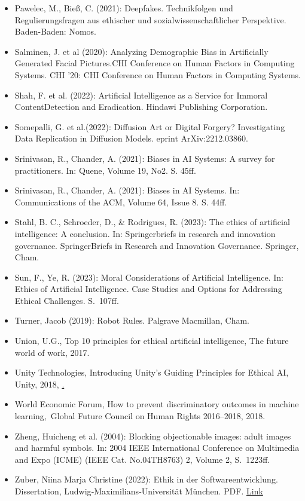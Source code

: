\documentclass[12pt]{article}
\begin{document}
\begin{itemize}
\item Pawelec, M., Bieß, C. (2021):  Deepfakes. Technikfolgen und Regulierungsfragen aus ethischer und sozialwissenschaftlicher Perspektive. Baden-Baden: Nomos.
\item Salminen, J. et al (2020): Analyzing Demographic Bias in Artificially Generated Facial Pictures.CHI Conference on Human Factors in Computing Systems. CHI '20: CHI Conference on Human Factors in Computing Systems.
\item Shah, F. et al. (2022): Artificial Intelligence as a Service for Immoral ContentDetection and Eradication. Hindawi Publishing Corporation.
\item Somepalli, G. et al.(2022): Diffusion Art or Digital Forgery? Investigating Data Replication in Diffusion Models. eprint ArXiv:2212.03860.
\item Srinivasan, R., Chander, A. (2021): Biases in AI Systems: A survey for practitioners. In: Quene, Volume 19, No2. S. 45ff.
\item Srinivasan, R., Chander, A. (2021): Biases in AI Systems. In: Communications of the ACM, Volume 64, Issue 8. S. 44ff.
\item Stahl, B. C., Schroeder, D., \& Rodrigues, R. (2023): The ethics of artificial intelligence: A conclusion. In: Springerbriefs in research and innovation governance. SpringerBriefs in Research and Innovation Governance. Springer, Cham.
\item Sun, F., Ye, R. (2023): Moral Considerations of Artificial Intelligence. In: Ethics of Artificial Intelligence. Case Studies and Options for Addressing Ethical Challenges. S. 107ff.
\item Turner, Jacob (2019): Robot Rules. Palgrave Macmillan, Cham.
\item Union, U.G., Top 10 principles for ethical artificial intelligence, The future world of work,  2017.
\item Unity Technologies, Introducing Unity’s Guiding Principles for Ethical AI, Unity, 2018, \href{https://blog.unity.com/technology/introducing-unitys-guiding-principles-for-ethical-ai}.
\item World Economic Forum, How to prevent discriminatory outcomes in machine learning, Global Future Council on Human Rights 2016–2018, 2018.
\item Zheng, Huicheng et al. (2004): Blocking objectionable images: adult images and harmful symbols. In: 2004 IEEE International Conference on Multimedia and Expo (ICME) (IEEE Cat. No.04TH8763) 2, Volume 2, S. 1223ff.
\item Zuber, Niina Marja Christine (2022): Ethik in der Softwareentwicklung. Dissertation, Ludwig‐Maximilians‐Universität München. PDF. \href{https://edoc.ub.uni-muenchen.de/31152/1/Zuber_Niina_Marja_Christine.pdf}{Link}
\end{itemize}
\end{document}
